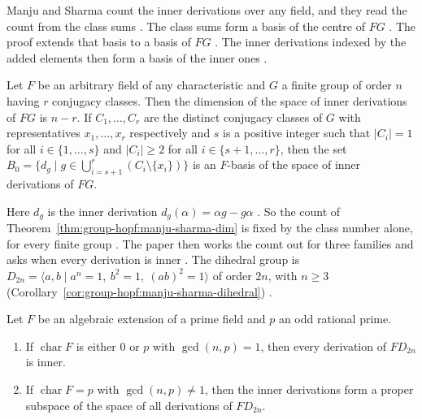 Manju and Sharma count the inner derivations over any field, and they read the
count from the class sums \cite[p.~5]{ManjuSharma2026}. The class sums
form a basis of the centre of $FG$ \cite[p.~5]{ManjuSharma2026}. The proof
extends that basis to a basis of $FG$
\cite[p.~5]{ManjuSharma2026}. The inner derivations indexed by the added
elements then form a basis of the inner ones \cite[p.~5]{ManjuSharma2026}.

\begin{theorem}\label{thm:group-hopf:manju-sharma-dim}
Let $F$ be an arbitrary field of any characteristic and $G$ a finite group of
order $n$ having $r$ conjugacy classes. Then the dimension of the space of inner
derivations of $FG$ is $n-r$. If $C_1,\dots,C_r$ are the distinct conjugacy
classes of $G$ with representatives $x_1,\dots,x_r$ respectively and $s$ is a
positive integer such that $|C_i|=1$ for all $i\in\{1,\dots,s\}$ and $|C_i|\ge2$
for all $i\in\{s+1,\dots,r\}$, then the set
$B_0=\{d_g\mid g\in\bigcup_{i=s+1}^{r}(C_i\setminus\{x_i\})\}$ is an $F$-basis of
the space of inner derivations of $FG$.
\end{theorem}

Here $d_g$ is the inner derivation $d_g(\alpha)=\alpha g-g\alpha$
\cite[Definition~2.2, p.~3]{ManjuSharma2026}. So the count of
Theorem~\ref{thm:group-hopf:manju-sharma-dim} is fixed by the class number
alone, for every finite group \cite[p.~5]{ManjuSharma2026}. The paper then
works the count out for three families and asks when every derivation is inner
\cite[Corollary~3.6, p.~10]{ManjuSharma2026}. The dihedral group is
$D_{2n}=\langle a,b\mid a^n=1,\ b^2=1,\ (ab)^2=1\rangle$ of order $2n$, with
$n\ge3$ (Corollary~\ref{cor:group-hopf:manju-sharma-dihedral})
\cite[p.~6]{ManjuSharma2026}.

\begin{corollary}\label{cor:group-hopf:manju-sharma-dihedral}
Let $F$ be an algebraic extension of a prime field and $p$ an odd rational
prime.
\begin{enumerate}
\item If $\operatorname{char}F$ is either $0$ or $p$ with $\gcd(n,p)=1$, then
every derivation of $FD_{2n}$ is inner.
\item If $\operatorname{char}F=p$ with $\gcd(n,p)\neq1$, then the inner
derivations form a proper subspace of the space of all derivations of $FD_{2n}$.
\end{enumerate}
\end{corollary}

